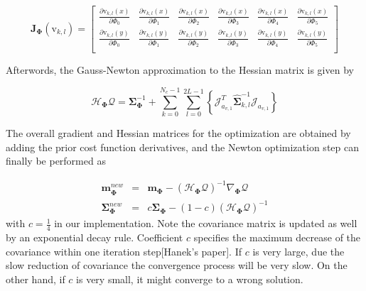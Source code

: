 \begin{equation}
  \label{eq:5.30}
\mathbf{J}_{\mathbf{\Phi}}(\mathrm{v}_{k,l}) =
\left[ {\begin{array}{cccccc}
\frac{\partial \mathrm{v}_{k,l}(x)}{\partial \Phi_0}& \frac{\partial \mathrm{v}_{k,l}(x)}{\partial \Phi_1}& \frac{\partial \mathrm{v}_{k,l}(x)}{\partial \Phi_2}& \frac{\partial \mathrm{v}_{k,l}(x)}{\partial \Phi_3}&\frac{\partial \mathrm{v}_{k,l}(x)}{\partial \Phi_4} &\frac{\partial \mathrm{v}_{k,l}(x)}{\partial \Phi_5}  \\
\frac{\partial \mathrm{v}_{k,l}(y)}{\partial \Phi_0}& \frac{\partial \mathrm{v}_{k,l}(y)}{\partial \Phi_1}& \frac{\partial \mathrm{v}_{k,l}(y)}{\partial \Phi_2}& \frac{\partial \mathrm{v}_{k,l}(y)}{\partial \Phi_3}&\frac{\partial \mathrm{v}_{k,l}(y)}{\partial \Phi_4} &\frac{\partial \mathrm{v}_{k,l}(y)}{\partial \Phi_5}  \\
 \end{array} } \right]
\end{equation}

Afterwords, the Gauss-Newton approximation to the Hessian
matrix is given by

\begin{equation}
  \label{eq:5.31}
  \mathcal{H}_{\mathbf{\Phi}} \mathcal{Q}  =
  \mathbf{\Sigma}_{\mathbf{\Phi}}^{-1} + \sum_{k = 0}^{N_{c}-1}
  \sum_{l=0}^{2L-1} \left\{\mathcal{J}_{a_{v,1}}^T\hat{\mathbf{\Sigma}}_{k,l}^{-1}\mathcal{J}_{a_{v,1}}\right\}
\end{equation}


The overall gradient and Hessian matrices for the optimization
are obtained by adding the prior cost function
derivatives, and the Newton optimization step can finally be
performed as

\begin{eqnarray}
  \mathbf{m}_{\mathbf{\Phi}}^{new} & = &
  \mathbf{m}_{\mathbf{\Phi}} - (\mathcal{H}_{\mathbf{\Phi}}
  \mathcal{Q})^{-1} \nabla_{\mathbf{\Phi}} \mathcal{Q} \nonumber \\
  \mathbf{\Sigma}_{\mathbf{\Phi}}^{new} & = &
  c\mathbf{\Sigma}_{\mathbf{\Phi}} - (1-c)(\mathcal{H}_{\mathbf{\Phi}}
  \mathcal{Q})^{-1}
\end{eqnarray}
with $c = \frac{1}{4}$ in our implementation. Note the covariance
matrix is updated as well by an exponential decay rule. Coefficient $c$ specifies the
maximum decrease of the covariance within one iteration step[Hanek's
paper]. If $c$ is very large, due the slow reduction of covariance the
convergence process will be very slow. On the other hand, if $c$ is
very small, it might converge to a wrong solution.

